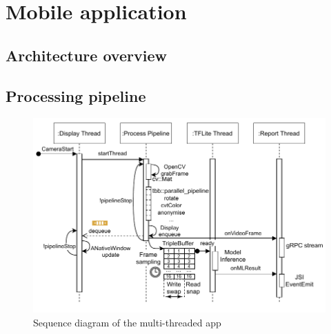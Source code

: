 \section{Mobile application}
\label{sec:Mobile application}

\subsection{Architecture overview}

\subsection{Processing pipeline}

\begin{figure}[!ht]
    \centering
    \includegraphics[width=\textwidth]{implementation/imgs/4-model-infer.pdf}
    \caption{Sequence diagram of the multi-threaded app}
    \label{fig:4-model-infer}
\end{figure}
